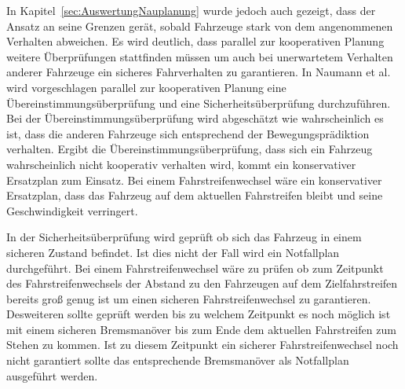 In Kapitel~\ref{sec:AuswertungNauplanung} wurde jedoch auch gezeigt, dass der Ansatz an seine Grenzen ger\"at, sobald Fahrzeuge stark von dem angenommenen Verhalten abweichen.
Es wird deutlich, dass parallel zur kooperativen Planung weitere \"Uberpr\"ufungen stattfinden m\"ussen um auch bei unerwartetem Verhalten anderer Fahrzeuge ein sicheres Fahrverhalten zu garantieren.
In Naumann et al. \cite{Naumann2018} wird vorgeschlagen parallel zur kooperativen Planung eine \"Ubereinstimmungs\"uberpr\"ufung und eine Sicherheits\"uberpr\"ufung durchzuf\"uhren.
Bei der \"Ubereinstimmungs\"uberpr\"ufung wird abgesch\"atzt wie wahrscheinlich es ist, dass die anderen Fahrzeuge sich entsprechend der Bewegungspr\"adiktion verhalten.
Ergibt die \"Ubereinstimmungs\"uberpr\"ufung, dass sich ein Fahrzeug wahrscheinlich nicht kooperativ verhalten wird, kommt ein konservativer Ersatzplan zum Einsatz.
Bei einem Fahrstreifenwechsel w\"are ein konservativer Ersatzplan, dass das Fahrzeug auf dem aktuellen Fahrstreifen bleibt und seine Geschwindigkeit verringert.

In der Sicherheits\"uberpr\"ufung wird gepr\"uft ob sich das Fahrzeug in einem sicheren Zustand befindet.
Ist dies nicht der Fall wird ein Notfallplan durchgef\"uhrt.
Bei einem Fahrstreifenwechsel w\"are zu pr\"ufen ob zum Zeitpunkt des Fahrstreifenwechsels der Abstand zu den Fahrzeugen auf dem Zielfahrstreifen bereits gro{\ss} genug ist um einen sicheren Fahrstreifenwechsel zu garantieren.
Desweiteren sollte gepr\"uft werden bis zu welchem Zeitpunkt es noch m\"oglich ist mit einem sicheren Bremsman\"over bis zum Ende dem aktuellen Fahrstreifen zum Stehen zu kommen.
Ist zu diesem Zeitpunkt ein sicherer Fahrstreifenwechsel noch nicht garantiert sollte das entsprechende Bremsman\"over als Notfallplan ausgef\"uhrt werden.

